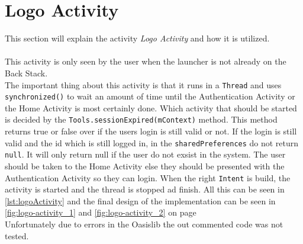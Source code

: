 \section{Logo Activity}
This section will explain the activity \textit{Logo Activity} and how it is utilized.\\\\
This activity is only seen by the user when the launcher is not already on the Back Stack.\\
The important thing about this activity is that it runs in a \verb+Thread+ and uses \verb+synchronized()+ to wait an amount of time until the Authentication Activity or the Home Activity is most certainly done. Which activity that should be started is decided by the \verb+Tools.sessionExpired(mContext)+ method. 
This method returns true or false over if the users login is still valid or not. If the login is still valid and the id which is still logged in, in the \verb+sharedPreferences+ do not return \verb+null+.
It will only return null if the user do not exsist in the system. The user should be taken to the Home Activity else they should be presented with the Authentication Activity so they can login.
When the right \verb+Intent+ is build, the activity is started and the thread is stopped ad finish.
All this can be seen in \autoref{lst:logoActivity} and the final design of the implementation can be seen in \autoref{fig:logo-activity_1} and \autoref{fig:logo-activity_2} on page \\
Unfortunately due to errors in the Oasislib the out commented code was not tested.

